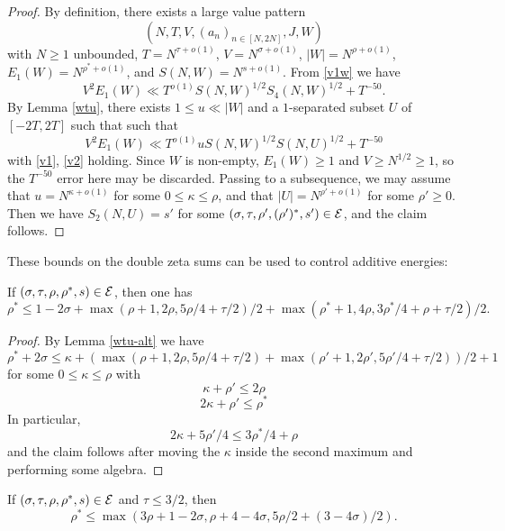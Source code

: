 \begin{proof}  By definition, there exists a large value pattern $$(N,T,V,(a_n)_{n \in [N,2N]},J,W)$$ with $N \geq 1$ unbounded, $T = N^{\tau+o(1)}$, $V = N^{\sigma+o(1)}$, $|W| = N^{\rho+o(1)}$, $E_1(W) = N^{\rho^*+o(1)}$, and $S(N,W) = N^{s+o(1)}$. From \eqref{v1w} we have
$$
    V^2 E_1(W) \ll T^{o(1)} S(N,W)^{1/2} S_4(N,W)^{1/2} + T^{-50}.
$$
By Lemma \ref{wtu}, there exists $1 \leq u \ll |W|$ and a $1$-separated subset $U$ of $[-2T,2T]$ such that
 such that
$$
    V^2 E_1(W) \ll T^{o(1)} u S(N,W)^{1/2} S(N,U)^{1/2} + T^{-50}
$$
with \eqref{v1}, \eqref{v2} holding.  Since $W$ is non-empty, $E_1(W) \geq 1$ and $V \geq N^{1/2} \geq 1$, so the $T^{-50}$ error here may be discarded.  Passing to a subsequence, we may assume that $u = N^{\kappa+o(1)}$ for some $0 \leq \kappa \leq \rho$, and that $|U| = N^{\rho'+o(1)}$ for some $\rho' \geq 0$.  Then we have $S_2(N,U) = s'$ for some
$(\sigma,\tau,\rho',(\rho')^*,s') \in \mathcal{E}$, and the claim follows.
\end{proof}

These bounds on the double zeta sums can be used to control additive energies:

\begin{theorem}\label{hbt}\cite[(33)]{heathbrown_zero_1979} If $(\sigma,\tau,\rho,\rho^*,s) \in \mathcal{E}$, then one has
$$ \rho^* \leq 1-2\sigma + \max(\rho+1, 2\rho, 5\rho/4+\tau/2)/2 + \max(\rho^*+1, 4\rho, 3\rho^*/4+\rho+\tau/2)/2.$$
\end{theorem}

\begin{proof} By Lemma \ref{wtu-alt} we have
$$ \rho^* + 2\sigma \leq \kappa + ( \max( \rho+1, 2\rho, 5\rho/4+\tau/2)+ \max( \rho'+1, 2\rho', 5\rho'/4+\tau/2) )/2 + 1$$
for some $0 \leq \kappa \leq \rho$ with
$$ \kappa + \rho' \leq 2\rho$$
$$ 2\kappa + \rho' \leq \rho^*$$
In particular,
$$ 2\kappa + 5\rho'/4 \leq 3\rho^*/4 + \rho$$
and the claim follows after moving the $\kappa$ inside the second maximum and performing some algebra.
\end{proof}

\begin{corollary}\label{hb-energy-simp}  If $(\sigma,\tau,\rho,\rho^*,s) \in \mathcal{E}$ and $\tau \leq 3/2$, then
$$ \rho^* \leq \max(3 \rho + 1-2\sigma, \rho +4-4\sigma, 5\rho/2 + (3-4\sigma)/2).$$
\end{corollary}

\literature
{}

